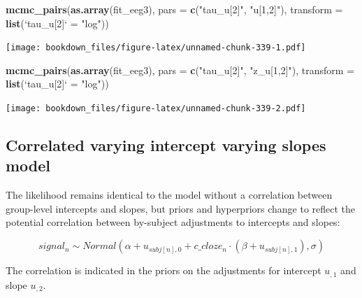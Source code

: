 \documentclass[12pt,]{krantz}
\newenvironment{Shaded}{\begin{snugshade}}{\end{snugshade}}
\newcommand{\DataTypeTok}[1]{\textcolor[rgb]{0.13,0.29,0.53}{#1}}
\newcommand{\KeywordTok}[1]{\textcolor[rgb]{0.13,0.29,0.53}{\textbf{#1}}}
\newcommand{\NormalTok}[1]{#1}
\newcommand{\StringTok}[1]{\textcolor[rgb]{0.31,0.60,0.02}{#1}}
\theoremstyle{definition}
\theoremstyle{definition}
\theoremstyle{definition}
\theoremstyle{remark}
\begin{document}
\begin{Shaded}
\begin{Highlighting}[]
\KeywordTok{mcmc_pairs}\NormalTok{(}\KeywordTok{as.array}\NormalTok{(fit_eeg3), }\DataTypeTok{pars =} \KeywordTok{c}\NormalTok{(}\StringTok{"tau_u[2]"}\NormalTok{, }\StringTok{"u[1,2]"}\NormalTok{),}
           \DataTypeTok{transform =} \KeywordTok{list}\NormalTok{(}\StringTok{`}\DataTypeTok{tau_u[2]}\StringTok{`}\NormalTok{ =}\StringTok{ "log"}\NormalTok{))}
\end{Highlighting}
\end{Shaded}

\texttt{[image: bookdown\_files/figure-latex/unnamed-chunk-339-1.pdf]}

\begin{Shaded}
\begin{Highlighting}[]
\KeywordTok{mcmc_pairs}\NormalTok{(}\KeywordTok{as.array}\NormalTok{(fit_eeg3), }\DataTypeTok{pars =} \KeywordTok{c}\NormalTok{(}\StringTok{"tau_u[2]"}\NormalTok{, }\StringTok{"z_u[1,2]"}\NormalTok{),}
           \DataTypeTok{transform =} \KeywordTok{list}\NormalTok{(}\StringTok{`}\DataTypeTok{tau_u[2]}\StringTok{`}\NormalTok{ =}\StringTok{ "log"}\NormalTok{))}
\end{Highlighting}
\end{Shaded}

\texttt{[image: bookdown\_files/figure-latex/unnamed-chunk-339-2.pdf]}

\hypertarget{sec:corrstan}{%
\subsection{Correlated varying intercept varying slopes model}\label{sec:corrstan}}

The likelihood remains identical to the model without a correlation between group-level intercepts and slopes, but priors and hyperpriors change to reflect the potential correlation between by-subject adjustments to intercepts and slopes:

\begin{equation}
  signal_n \sim Normal(\alpha + u_{subj[n],0} + c\_cloze_n \cdot  (\beta + u_{subj[n],1}),\sigma)
\end{equation}

The correlation is indicated in the priors on the adjustments for intercept \(u_{,1}\) and slope \(u_{,2}\).
\end{document}

